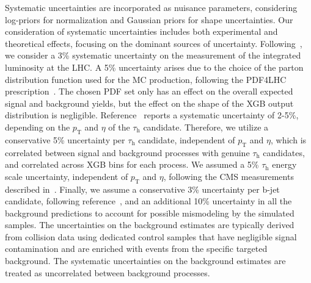 Systematic uncertainties are incorporated as nuisance parameters, considering log-priors for normalization and Gaussian priors for shape uncertainties. Our consideration of systematic uncertainties includes both experimental and theoretical effects, focusing on the dominant sources of uncertainty. Following~\cite{lumiRef}, we consider a 3\% systematic uncertainty on the measurement of the integrated luminosity at the LHC. A 5\% uncertainty arises due to the choice of the parton distribution function used for the MC production, following the PDF4LHC prescription~\cite{Butterworth:2015oua}. The chosen PDF set only has an effect on the overall expected signal and background yields, but the effect on the shape of the XGB output distribution is negligible. Reference~\cite{CMS_DeepTau} reports a systematic uncertainty of 2-5\%, depending on the $p_{\textrm{T}}$ and $\eta$ of the $\tau_{\textrm{h}}$ candidate. Therefore, we utilize a conservative 5\% uncertainty per $\tau_{\textrm{h}}$ candidate, independent of $p_{\textrm{T}}$ and $\eta$, which is correlated between signal and background processes with genuine $\tau_{\textrm{h}}$ candidates, and correlated across XGB bins for each process. We assumed a 5\% $\tau_{\textrm{h}}$ energy scale uncertainty, independent of $p_{\textrm{T}}$ and $\eta$, following the CMS measurements described in~\cite{CMS_DeepTau}.  Finally, we assume a conservative 3\% uncertainty per b-jet candidate, following reference~\cite{CMSbtag}, and an additional 10\% uncertainty in all the background predictions to account for possible mismodeling by the simulated samples. The uncertainties on the background estimates are typically derived from collision data using dedicated control samples that have negligible signal contamination and are enriched with events from the specific targeted background. The systematic uncertainties on the background estimates are treated as uncorrelated between background processes.
